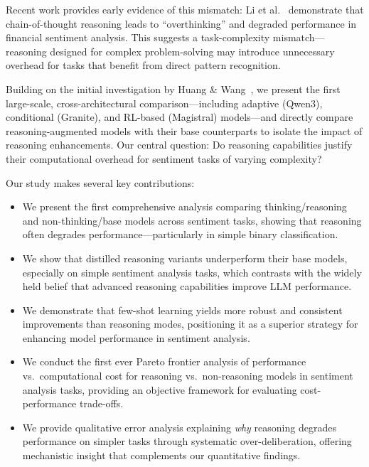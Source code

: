 \documentclass[runningheads]{llncs}
\begin{document}
Recent work provides early evidence of this mismatch: Li et al.~\cite{li2025financial} demonstrate that chain-of-thought reasoning leads to ``overthinking'' and degraded performance in financial sentiment analysis. This suggests a task-complexity mismatch---reasoning designed for complex problem-solving may introduce unnecessary overhead for tasks that benefit from direct pattern recognition.

Building on the initial investigation by Huang \& Wang~\cite{huang2025explainable}, we present the first large-scale, cross-architectural comparison---including adaptive (Qwen3), conditional (Granite), and RL-based (Magistral) models---and directly compare reasoning-augmented models with their base counterparts to isolate the impact of reasoning enhancements. Our central question: Do reasoning capabilities justify their computational overhead for sentiment tasks of varying complexity?

Our study makes several key contributions:
\begin{itemize}
    \item We present the first comprehensive analysis comparing thinking/reasoning and non-thinking/base models across sentiment tasks, showing that reasoning often degrades performance---particularly in simple binary classification.
    \item We show that distilled reasoning variants underperform their base models, especially on simple sentiment analysis tasks, which contrasts with the widely held belief that advanced reasoning capabilities improve LLM performance.
    \item We demonstrate that few-shot learning yields more robust and consistent improvements than reasoning modes, positioning it as a superior strategy for enhancing model performance in sentiment analysis.
    \item We conduct the first ever Pareto frontier analysis of performance vs.\ computational cost for reasoning vs.\ non-reasoning models in sentiment analysis tasks, providing an objective framework for evaluating cost-performance trade-offs.
    \item We provide qualitative error analysis explaining \emph{why} reasoning degrades performance on simpler tasks through systematic over-deliberation, offering mechanistic insight that complements our quantitative findings.
\end{itemize}
\end{document}
